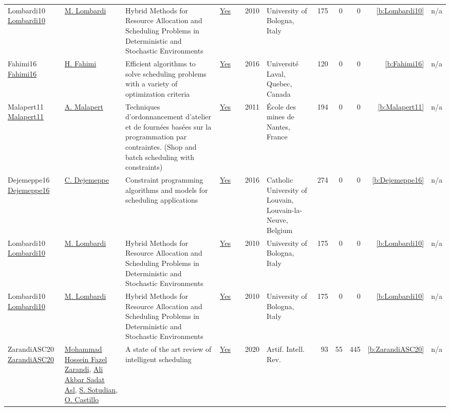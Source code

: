 {\begin{longtable}{>{\raggedright\arraybackslash}p{3cm}>{\raggedright\arraybackslash}p{6cm}>{\raggedright\arraybackslash}p{6.5cm}rrrp{2.5cm}rrrrr}
Lombardi10 \href{http://amsdottorato.unibo.it/2961/}{Lombardi10} & \hyperref[auth:a143]{M. Lombardi} & Hybrid Methods for Resource Allocation and Scheduling Problems in Deterministic and Stochastic Environments & \href{../works/Lombardi10.pdf}{Yes} & \cite{Lombardi10} & 2010 & University of Bologna, Italy & 175 & 0 & 0 & \ref{b:Lombardi10} & n/a\\
Fahimi16 \href{http://cp2014.a4cp.org/sites/default/files/hamed_fahimi_-_efficient_algorithms_to_solve_scheduling_problems_with_a_variety_of_optimization_criteria.pdf}{Fahimi16} & \hyperref[auth:a122]{H. Fahimi} & Efficient algorithms to solve scheduling problems with a variety of optimization criteria & \href{../works/Fahimi16.pdf}{Yes} & \cite{Fahimi16} & 2016 & Universit{\'{e}} Laval, Quebec, Canada & 120 & 0 & 0 & \ref{b:Fahimi16} & n/a\\
Malapert11 \href{https://tel.archives-ouvertes.fr/tel-00630122}{Malapert11} & \hyperref[auth:a82]{A. Malapert} & Techniques d'ordonnancement d'atelier et de fourn{\'{e}}es bas{\'{e}}es sur la programmation par contraintes. (Shop and batch scheduling with constraints) & \href{../works/Malapert11.pdf}{Yes} & \cite{Malapert11} & 2011 & {\'{E}}cole des mines de Nantes, France & 194 & 0 & 0 & \ref{b:Malapert11} & n/a\\
Dejemeppe16 \href{https://hdl.handle.net/2078.1/178078}{Dejemeppe16} & \hyperref[auth:a207]{C. Dejemeppe} & Constraint programming algorithms and models for scheduling applications & \href{../works/Dejemeppe16.pdf}{Yes} & \cite{Dejemeppe16} & 2016 & Catholic University of Louvain, Louvain-la-Neuve, Belgium & 274 & 0 & 0 & \ref{b:Dejemeppe16} & n/a\\
Lombardi10 \href{http://amsdottorato.unibo.it/2961/}{Lombardi10} & \hyperref[auth:a143]{M. Lombardi} & Hybrid Methods for Resource Allocation and Scheduling Problems in Deterministic and Stochastic Environments & \href{../works/Lombardi10.pdf}{Yes} & \cite{Lombardi10} & 2010 & University of Bologna, Italy & 175 & 0 & 0 & \ref{b:Lombardi10} & n/a\\
Lombardi10 \href{http://amsdottorato.unibo.it/2961/}{Lombardi10} & \hyperref[auth:a143]{M. Lombardi} & Hybrid Methods for Resource Allocation and Scheduling Problems in Deterministic and Stochastic Environments & \href{../works/Lombardi10.pdf}{Yes} & \cite{Lombardi10} & 2010 & University of Bologna, Italy & 175 & 0 & 0 & \ref{b:Lombardi10} & n/a\\
ZarandiASC20 \href{https://doi.org/10.1007/s10462-018-9667-6}{ZarandiASC20} & \hyperref[auth:a835]{Mohammad Hossein Fazel Zarandi}, \hyperref[auth:a836]{Ali Akbar Sadat Asl}, \hyperref[auth:a837]{S. Sotudian}, \hyperref[auth:a838]{O. Castillo} & A state of the art review of intelligent scheduling & \href{../works/ZarandiASC20.pdf}{Yes} & \cite{ZarandiASC20} & 2020 & Artif. Intell. Rev. & 93 & 55 & 445 & \ref{b:ZarandiASC20} & n/a\\
\end{longtable}
}

